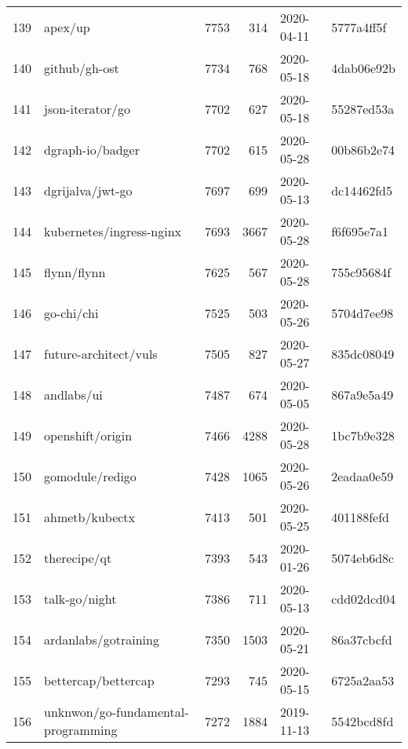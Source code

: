 \begin{longtable}{llrrll}
    139 &                                            apex/up &   7753 &    314 & 2020-04-11 &  5777a4ff5f \\
    140 &                                      github/gh-ost &   7734 &    768 & 2020-05-18 &  4dab06e92b \\
    141 &                                   json-iterator/go &   7702 &    627 & 2020-05-18 &  55287ed53a \\
    142 &                                   dgraph-io/badger &   7702 &    615 & 2020-05-28 &  00b86b2e74 \\
    143 &                                   dgrijalva/jwt-go &   7697 &    699 & 2020-05-13 &  dc14462fd5 \\
    144 &                           kubernetes/ingress-nginx &   7693 &   3667 & 2020-05-28 &  f6f695e7a1 \\
    145 &                                        flynn/flynn &   7625 &    567 & 2020-05-28 &  755c95684f \\
    146 &                                         go-chi/chi &   7525 &    503 & 2020-05-26 &  5704d7ee98 \\
    147 &                              future-architect/vuls &   7505 &    827 & 2020-05-27 &  835dc08049 \\
    148 &                                         andlabs/ui &   7487 &    674 & 2020-05-05 &  867a9e5a49 \\
    149 &                                   openshift/origin &   7466 &   4288 & 2020-05-28 &  1bc7b9e328 \\
    150 &                                    gomodule/redigo &   7428 &   1065 & 2020-05-26 &  2eadaa0e59 \\
    151 &                                     ahmetb/kubectx &   7413 &    501 & 2020-05-25 &  401188fefd \\
    152 &                                       therecipe/qt &   7393 &    543 & 2020-01-26 &  5074eb6d8c \\
    153 &                                      talk-go/night &   7386 &    711 & 2020-05-13 &  cdd02dcd04 \\
    154 &                               ardanlabs/gotraining &   7350 &   1503 & 2020-05-21 &  86a37cbcfd \\
    155 &                                bettercap/bettercap &   7293 &    745 & 2020-05-15 &  6725a2aa53 \\
    156 &                 unknwon/go-fundamental-programming &   7272 &   1884 & 2019-11-13 &  5542bcd8fd \\

\end{longtable}
